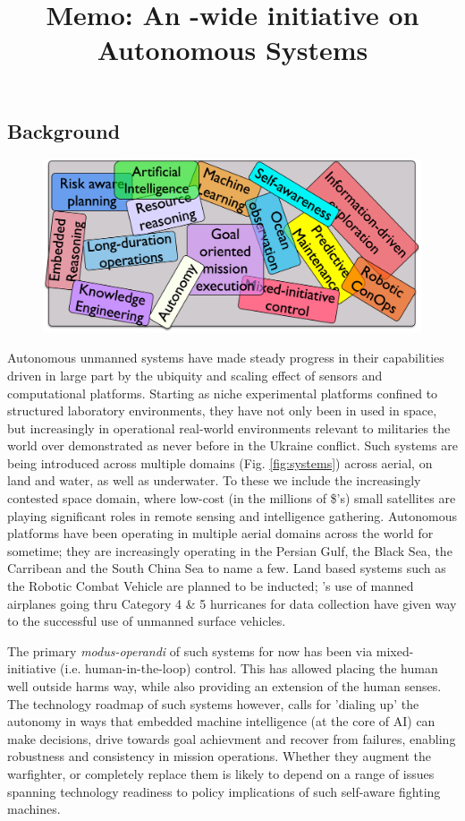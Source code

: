 \documentclass[10pt,letterpaper]{article}
\title{Memo: An \auke-wide initiative on Autonomous Systems}
\author{%
  }
\begin{document}
\maketitle{}

\subsection{Background}

\begin{figure}
  \centering
  \includegraphics[scale=0.09]{fig/word-bag.jpg}
  \caption{}
 \label{fig:topics}
\end{figure}

Autonomous unmanned systems have made steady progress in their
capabilities driven in large part by the ubiquity and scaling effect
of sensors and computational platforms. Starting as niche experimental
platforms confined to structured laboratory environments, they have
not only been in used in space, but increasingly in operational
real-world environments relevant to militaries the world over
demonstrated as never before in the Ukraine conflict. Such systems are
being introduced across multiple domains (Fig. \ref{fig:systems})
across aerial, on land and water, as well as underwater. To these we
include the increasingly contested space domain, where low-cost (in
the millions of \$'s) small satellites are playing significant roles
in remote sensing and intelligence gathering. Autonomous platforms
have been operating in multiple aerial domains across the world for
sometime; they are increasingly operating in the Persian Gulf, the
Black Sea, the Carribean and the South China Sea to name a few. Land
based systems such as the Robotic Combat Vehicle are planned to be
inducted; \noae's use of manned airplanes going thru Category 4 \& 5
hurricanes for data collection have given way to the successful use of
unmanned surface vehicles. 

The primary \emph{modus-operandi} of such systems for now has been via
mixed-initiative (i.e. human-in-the-loop) control. This has allowed
placing the human well outside harms way, while also providing an
extension of the human senses. The technology roadmap of such systems
however, calls for 'dialing up' the autonomy in ways that embedded
machine intelligence (at the core of AI) can make decisions, drive
towards goal achievment and recover from failures, enabling robustness
and consistency in mission operations. Whether they augment the
warfighter, or completely replace them is likely to depend on a range
of issues spanning technology readiness to policy implications of such
self-aware fighting machines.
\end{document}
